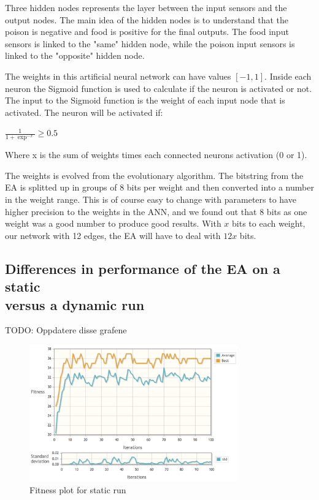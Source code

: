 Three hidden nodes represents the layer between the input sensors and the output nodes. The main idea of the hidden nodes is to understand that the poison is negative and food is positive for the final outputs. The food input sensors is linked to the "same" hidden node, while the poison input sensors is linked to the "opposite" hidden node. 

The weights in this artificial neural network can have values $[-1, 1]$. Inside each neuron the Sigmoid function is used to calculate if the neuron is activated or not. The input to the Sigmoid function is the weight of each input node that is activated. The neuron will be activated if:

\begin{center}
	$\frac{1}{1 + \exp^{-x}} \geq 0.5$
\end{center}

Where x is the sum of weights times each connected neurons activation (0 or 1).

The weights is evolved from the evolutionary algorithm. The bitstring from the EA is splitted up in groups of 8 bits per weight and then converted into a number in the weight range. This is of course easy to change with parameters to have higher precision to the weights in the ANN, and we found out that 8 bits as one weight was a good number to produce good results. With $x$ bits to each weight, our network with 12 edges, the EA will have to deal with $12x$ bits.

\subsection{Differences in performance of the EA on a static \\versus a dynamic run}

TODO: Oppdatere disse grafene

\begin{figure}[H]
  \centering
    \includegraphics[width=0.8\textwidth]{img/Flatland_static}
    \caption{Fitness plot for static run}
\end{figure}

